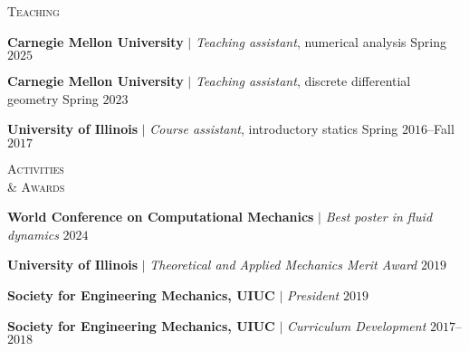 \documentclass[10pt]{article}
\begin{document}
%
\begin{multicols}{2}
\textsc{Teaching}
\columnbreak

\textbf{Carnegie Mellon University} $|$ \textit{Teaching assistant}, numerical analysis \hfill Spring $2025$

\vspace{-0.75em}
\textbf{Carnegie Mellon University} $|$ \textit{Teaching assistant}, discrete differential geometry \hfill Spring $2023$

\vspace{-0.75em}
\textbf{University of Illinois} $|$ \textit{Course assistant}, introductory statics
\hfill Spring $2016$--Fall $2017$

\end{multicols}
\vspace{-1.5em} 
\begin{multicols}{2}
\textsc{Activities\\ \& Awards}
\columnbreak

\textbf{World Conference on Computational Mechanics} $|$ \textit{Best poster in fluid dynamics} \hfill $2024$

\vspace{-0.75em}
\textbf{University of Illinois} $|$ \textit{Theoretical and Applied Mechanics Merit Award} \hfill $2019$

\vspace{-0.75em}
\textbf{Society for Engineering Mechanics, UIUC} $|$ \textit{President}
\hfill $2019$ %

\vspace{-0.75em}
\textbf{Society for Engineering Mechanics, UIUC} $|$ \textit{Curriculum Development} \hfill $2017$--$2018$ %

\end{multicols}
\end{document}
